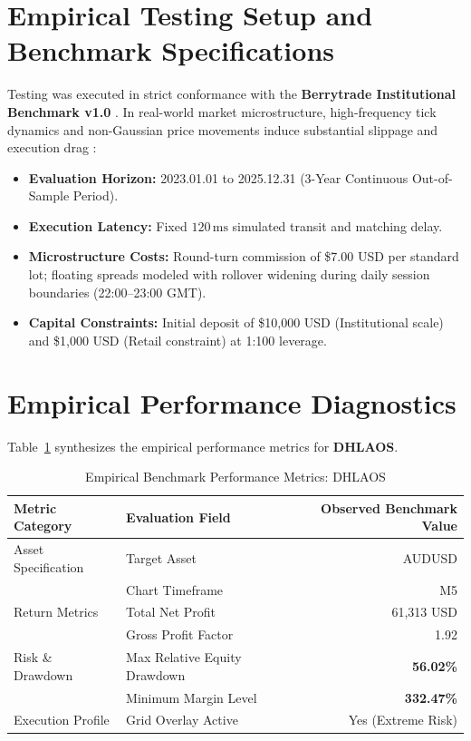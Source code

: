 \documentclass[11pt,a4paper]{article}
\begin{document}
\section{Empirical Testing Setup and Benchmark Specifications}
Testing was executed in strict conformance with the \textbf{Berrytrade Institutional Benchmark v1.0} \cite{artsu2026illusion}. In real-world market microstructure, high-frequency tick dynamics and non-Gaussian price movements induce substantial slippage and execution drag \cite{kyle1985continuous, amihud2002illiquidity, cont2001empirical, mandelbrot1963variation}:
\begin{itemize}
    \item \textbf{Evaluation Horizon:} 2023.01.01 to 2025.12.31 (3-Year Continuous Out-of-Sample Period).
    \item \textbf{Execution Latency:} Fixed $120\,\text{ms}$ simulated transit and matching delay.
    \item \textbf{Microstructure Costs:} Round-turn commission of \$7.00 USD per standard lot; floating spreads modeled with rollover widening during daily session boundaries (22:00--23:00 GMT).
    \item \textbf{Capital Constraints:} Initial deposit of \$10,000 USD (Institutional scale) and \$1,000 USD (Retail constraint) at 1:100 leverage.
\end{itemize}

\section{Empirical Performance Diagnostics}
Table~\ref{tab:metrics} synthesizes the empirical performance metrics for \textbf{DHLAOS}.

\begin{table}[H]
\centering
\caption{Empirical Benchmark Performance Metrics: DHLAOS}
\label{tab:metrics}
\begin{tabular}{llr}
\toprule
\textbf{Metric Category} & \textbf{Evaluation Field} & \textbf{Observed Benchmark Value} \\
\midrule
Asset Specification & Target Asset & AUDUSD \\
& Chart Timeframe & M5 \\
Return Metrics & Total Net Profit & 61,313 USD \\
& Gross Profit Factor & 1.92 \\
Risk \& Drawdown & Max Relative Equity Drawdown & \textbf{56.02\%} \\
& Minimum Margin Level & \textbf{332.47\%} \\
Execution Profile & Grid Overlay Active & Yes (Extreme Risk) \\
\bottomrule
\end{tabular}
\end{table}
\end{document}

